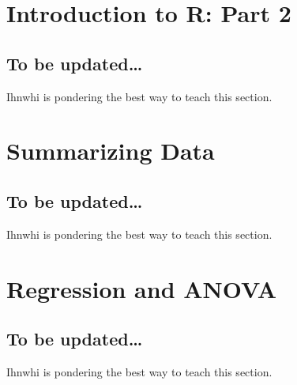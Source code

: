 \documentclass[
]{book}
\begin{document}
\chapter{Introduction to R: Part 2}\label{introduction-to-r-part-2}

\section{To be updated\ldots{}}\label{to-be-updated}

Ihnwhi is pondering the best way to teach this section.

\chapter{Summarizing Data}\label{summarizing-data}

\section{To be updated\ldots{}}\label{to-be-updated-1}

Ihnwhi is pondering the best way to teach this section.

\chapter{Regression and ANOVA}\label{regression-and-anova}

\section{To be updated\ldots{}}\label{to-be-updated-2}

Ihnwhi is pondering the best way to teach this section.

  
\end{document}
